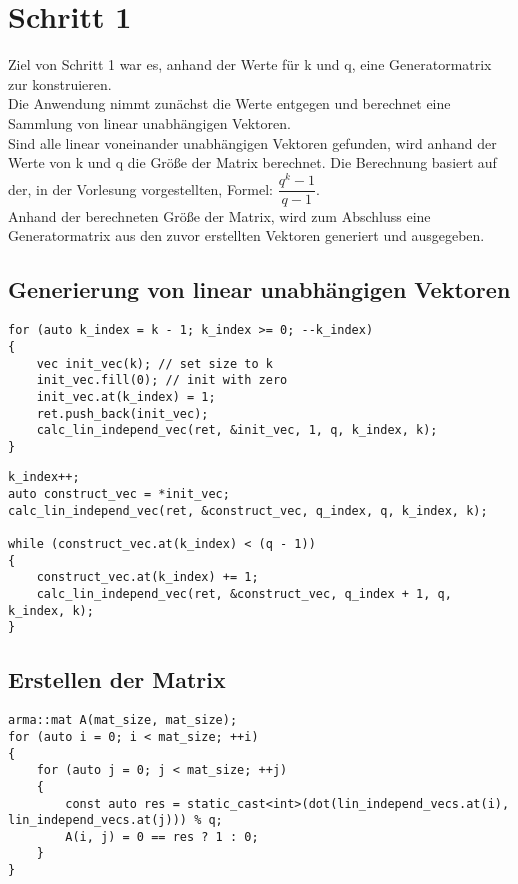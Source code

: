 \section{Schritt 1}
Ziel von Schritt 1 war es, anhand der Werte für k und q, eine Generatormatrix zur konstruieren. \\
Die Anwendung nimmt zunächst die Werte  entgegen und berechnet eine Sammlung von linear unabhängigen Vektoren.\\
Sind alle linear voneinander unabhängigen Vektoren gefunden, wird anhand der Werte von k und q die Größe der Matrix berechnet. Die Berechnung basiert auf der, in der Vorlesung vorgestellten, Formel: $\dfrac{q^{k}-1}{q-1}$. \\
Anhand der berechneten Größe der Matrix, wird zum Abschluss eine Generatormatrix aus den zuvor erstellten Vektoren generiert und ausgegeben.
\subsection{Generierung von linear unabhängigen Vektoren}
\begin{lstlisting}[caption=Generierung der Vektoren]
for (auto k_index = k - 1; k_index >= 0; --k_index)
{
	vec init_vec(k); // set size to k
	init_vec.fill(0); // init with zero
	init_vec.at(k_index) = 1;
	ret.push_back(init_vec);
	calc_lin_independ_vec(ret, &init_vec, 1, q, k_index, k);
}	
\end{lstlisting}
\begin{lstlisting}[caption=Berechnung der linearen Unabhängigkeiten]
k_index++;
auto construct_vec = *init_vec;
calc_lin_independ_vec(ret, &construct_vec, q_index, q, k_index, k);
	
while (construct_vec.at(k_index) < (q - 1))
{
	construct_vec.at(k_index) += 1;
	calc_lin_independ_vec(ret, &construct_vec, q_index + 1, q, k_index, k);
}
\end{lstlisting}

\subsection{Erstellen der Matrix}
\begin{lstlisting}[caption=Erstellen der Generatormatrix]
arma::mat A(mat_size, mat_size);
for (auto i = 0; i < mat_size; ++i)
{
	for (auto j = 0; j < mat_size; ++j)
	{
		const auto res = static_cast<int>(dot(lin_independ_vecs.at(i), lin_independ_vecs.at(j))) % q;
		A(i, j) = 0 == res ? 1 : 0;
	}
}
\end{lstlisting}
  
